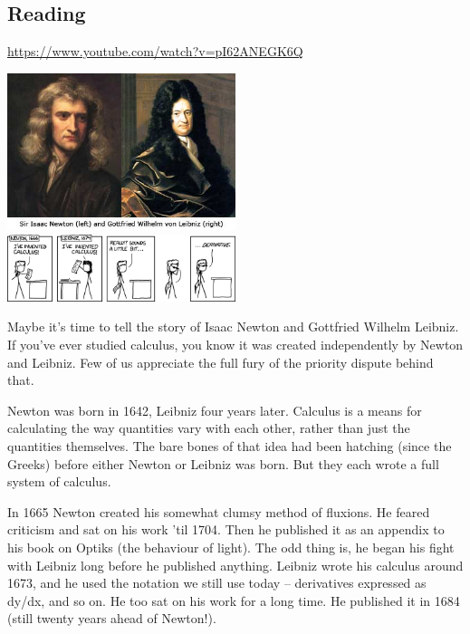 



\subsection*{Reading}
\begin{center}
\begin{tcolorbox}[width=0.8\textwidth,colback={white},title={\textbf{Go and watch...}},colbacktitle=black,coltitle=white]
  \textcolor{black}{\url{https://www.youtube.com/watch?v=pI62ANEGK6Q}}
\end{tcolorbox}
\end{center}

\noindent
\includegraphics[width=0.5\textwidth]{newton-leibniz}
\includegraphics[width=0.5\textwidth]{newton-leibniz-2}

Maybe it's time to tell the story of Isaac Newton and Gottfried Wilhelm Leibniz. If you've ever studied calculus, you know it was created independently by Newton and Leibniz. Few of us appreciate the full fury of the priority dispute behind that.

Newton was born in 1642, Leibniz four years later. Calculus is a means for calculating the way quantities vary with each other, rather than just the quantities themselves. The bare bones of that idea had been hatching (since the Greeks) before either Newton or Leibniz was born. But they each wrote a full system of calculus.

In 1665 Newton created his somewhat clumsy method of fluxions. He feared criticism and sat on his work 'til 1704. Then he published it as an appendix to his book on Optiks (the behaviour of light). The odd thing is, he began his fight with Leibniz long before he published anything. Leibniz wrote his calculus around 1673, and he used the notation we still use today -- derivatives expressed as dy/dx, and so on. He too sat on his work for a long time. He published it in 1684 (still twenty years ahead of Newton!).

